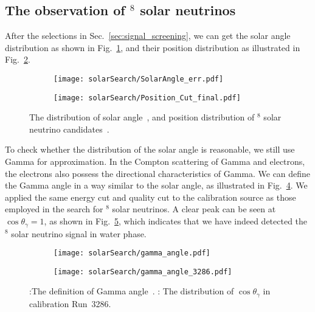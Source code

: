 \subsection{The observation of $^8$ solar neutrinos}
\label{sec:solar_observation}
After the selections in Sec.~\ref{sec:signal_screening}, we can get the solar angle distribution as shown in Fig.~\ref{fig:solar_angle}, and their position distribution as illustrated in Fig.~\ref{fig:solar_pos}.
\begin{figure}[htbp]
	\centering
	\begin{subfigure}{0.5\textwidth}
		\centering
		\texttt{[image: solarSearch/SolarAngle\_err.pdf]}
		\caption{}
		\label{fig:solar_angle}
	\end{subfigure}%
	\begin{subfigure}{0.5\textwidth}
		\centering
		\texttt{[image: solarSearch/Position\_Cut\_final.pdf]}
		\caption{}
		\label{fig:solar_pos}
	\end{subfigure}
	\caption{The distribution of solar angle~,  and position distribution of $^8$ solar neutrino candidates~.}
	\label{fig:solar_final_distribution}
\end{figure}

To check whether the distribution of the solar angle is reasonable, we still use Gamma for approximation. In the Compton scattering of Gamma and electrons, the electrons also possess the directional characteristics of Gamma. We can define the Gamma angle in a way similar to the solar angle, as illustrated in Fig.~\ref{fig:solar_gamma_angle}. We applied the same energy cut and quality cut to the calibration source as those employed in the search for $^8$ solar neutrinos. A clear peak can be seen at $\cos\theta_{\gamma}=1$, as shown in Fig.~\ref{fig:solar_gamma_dis}, which indicates that we have indeed detected the $^8$ solar neutrino signal in water phase.

\begin{figure}[htbp]
	\centering
	\begin{subfigure}{0.5\textwidth}
		\centering
		\texttt{[image: solarSearch/gamma\_angle.pdf]}
		\caption{}
		\label{fig:solar_gamma_angle}
	\end{subfigure}%
	\begin{subfigure}{0.5\textwidth}
		\centering
		\texttt{[image: solarSearch/gamma\_angle\_3286.pdf]}
		\caption{}
		\label{fig:solar_gamma_dis}
	\end{subfigure}
	\caption{:The definition of Gamma angle~. : The distribution of $\cos\theta_{\gamma}$ in calibration Run~3286.}
	\label{fig:solar_final_gamma_angle}
\end{figure}


